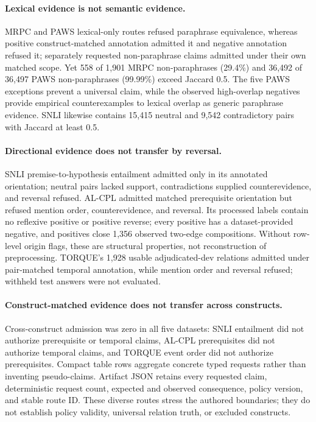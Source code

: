 \documentclass[manuscript,screen,review]{acmart}
\begin{document}
\paragraph{Lexical evidence is not semantic evidence.} MRPC and PAWS lexical-only routes refused paraphrase equivalence, whereas positive construct-matched annotation admitted it and negative annotation refused it; separately requested non-paraphrase claims admitted under their own matched scope. Yet 558 of 1,901 MRPC non-paraphrases (29.4\%) and 36,492 of 36,497 PAWS non-paraphrases (99.99\%) exceed Jaccard 0.5. The five PAWS exceptions prevent a universal claim, while the observed high-overlap negatives provide empirical counterexamples to lexical overlap as generic paraphrase evidence. SNLI likewise contains 15,415 neutral and 9,542 contradictory pairs with Jaccard at least 0.5.

\paragraph{Directional evidence does not transfer by reversal.} SNLI premise-to-hypothesis entailment admitted only in its annotated orientation; neutral pairs lacked support, contradictions supplied counterevidence, and reversal refused. AL-CPL admitted matched prerequisite orientation but refused mention order, counterevidence, and reversal. Its processed labels contain no reflexive positive or positive reverse; every positive has a dataset-provided negative, and positives close 1,356 observed two-edge compositions. Without row-level origin flags, these are structural properties, not reconstruction of preprocessing. TORQUE's 1,928 usable adjudicated-dev relations admitted under pair-matched temporal annotation, while mention order and reversal refused; withheld test answers were not evaluated.

\paragraph{Construct-matched evidence does not transfer across constructs.} Cross-construct admission was zero in all five datasets: SNLI entailment did not authorize prerequisite or temporal claims, AL-CPL prerequisites did not authorize temporal claims, and TORQUE event order did not authorize prerequisites. Compact table rows aggregate concrete typed requests rather than inventing pseudo-claims. Artifact JSON retains every requested claim, deterministic request count, expected and observed consequence, policy version, and stable route ID. These diverse routes stress the authored boundaries; they do not establish policy validity, universal relation truth, or excluded constructs.
\end{document}
